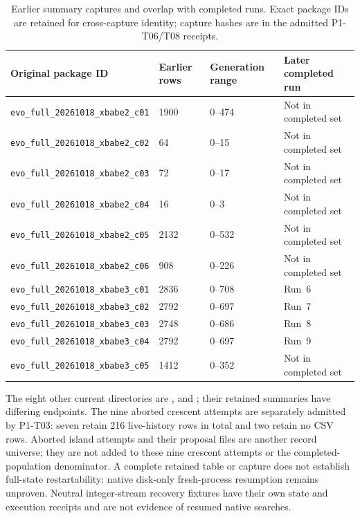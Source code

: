 \begin{table}[t]
\centering
\caption{Earlier summary captures and overlap with completed runs. Exact package IDs are retained for cross-capture identity; capture hashes are in the admitted P1-T06/T08 receipts.}
\small
\begin{tabular}{@{}llll@{}}
\toprule
\textbf{Original package ID} & \textbf{Earlier rows} & \textbf{Generation range} & \textbf{Later completed run} \\
\midrule
\nolinkurl{evo_full_20261018_xbabe2_c01} & 1900 & 0--474 & Not in completed set \\
\nolinkurl{evo_full_20261018_xbabe2_c02} & 64 & 0--15 & Not in completed set \\
\nolinkurl{evo_full_20261018_xbabe2_c03} & 72 & 0--17 & Not in completed set \\
\nolinkurl{evo_full_20261018_xbabe2_c04} & 16 & 0--3 & Not in completed set \\
\nolinkurl{evo_full_20261018_xbabe2_c05} & 2132 & 0--532 & Not in completed set \\
\nolinkurl{evo_full_20261018_xbabe2_c06} & 908 & 0--226 & Not in completed set \\
\nolinkurl{evo_full_20261018_xbabe3_c01} & 2836 & 0--708 & Run~6 \\
\nolinkurl{evo_full_20261018_xbabe3_c02} & 2792 & 0--697 & Run~7 \\
\nolinkurl{evo_full_20261018_xbabe3_c03} & 2748 & 0--686 & Run~8 \\
\nolinkurl{evo_full_20261018_xbabe3_c04} & 2792 & 0--697 & Run~9 \\
\nolinkurl{evo_full_20261018_xbabe3_c05} & 1412 & 0--352 & Not in completed set \\
\bottomrule
\end{tabular}
\end{table}
The eight other current directories are ,  and ; their retained summaries have differing endpoints. The nine aborted crescent attempts are separately admitted by P1-T03: seven retain 216 live-history rows in total and two retain no CSV rows. Aborted island attempts and their proposal files are another record universe; they are not added to these nine crescent attempts or the completed-population denominator. A complete retained table or capture does not establish full-state restartability: native disk-only fresh-process resumption remains unproven. Neutral integer-stream recovery fixtures have their own state and execution receipts and are not evidence of resumed native searches.

